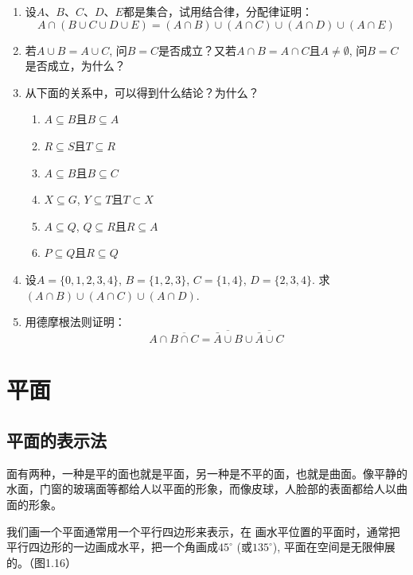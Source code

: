 \begin{enumerate}
\item   设$A$、$B$、$C$、$D$、$E$都是集合，试用结合律，分配律证明：
\[A\cap  (B\cup C\cup D\cup E)=(A\cap B)\cup (A\cap C)\cup (A\cap D)\cup (A\cap E)\] 
\item 若$A\cup B=A\cup C$, 问$B=C$是否成立？又若$A\cap B=A\cap C$且$A\ne \emptyset$, 问$B=C$是否成立，为什么？
\item 从下面的关系中，可以得到什么结论？为什么？
\begin{multicols}{2}
\begin{enumerate}
  \item $A\subseteq B$且$B\subseteq A$
  \item $R\subseteq S$且$T\subseteq R$
  \item $A\subseteq B$且$B\subseteq C$
  \item $X\subseteq G$, $Y\subseteq T$且$T\subset X$
  \item $A\subseteq Q$, $Q\subseteq R$且$R\subseteq A$
  \item $P\subseteq Q$且$R\subseteq Q$
\end{enumerate}
\end{multicols}

\item 设$A=\{0, 1, 2, 3, 4\}$, $B=\{1, 2, 3\}$, $C=\{1, 4\}$, 
  $D= \{2, 3, 4\}$. 求$(A\cap B)\cup (A\cap C)\cup (A\cap D)$.
\item 用德摩根法则证明：
\[A\cap \overline{B\cap C}=\overline{\bar A\cup B}\cup\overline{\bar A\cup C}\]
\end{enumerate}


\section{平面}

\subsection{平面的表示法}

面有两种，一种是平的面也就是平面，另一种是不平的面，也就是曲面。像平静的水面，门窗的玻璃面等都给人以平面的形象，而像皮球，人脸部的表面都给人以曲面的形象。

我们画一个平面通常用一个平行四边形来表示，在
画水平位置的平面时，通常把平行四边形的一边画成水平，把一个角画成$45^{\circ}$ (或$135^{\circ}$), 平面在空间是无限伸展的。（图1.16）

\begin{figure}[htp]
  \centering
  
  \caption{}
\end{figure}

